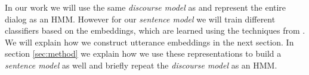 In our work we will use the same \emph{discourse model} as  and represent the entire dialog as an HMM. However for our \emph{sentence model} we will train different classifiers based on the embeddings, which are learned using the techniques from . We will explain how we construct utterance embeddings in the next section. In section \ref{sec:method} we explain how we use these representations to build a \emph{sentence model} as well and briefly repeat the \emph{discourse model} as an HMM.

